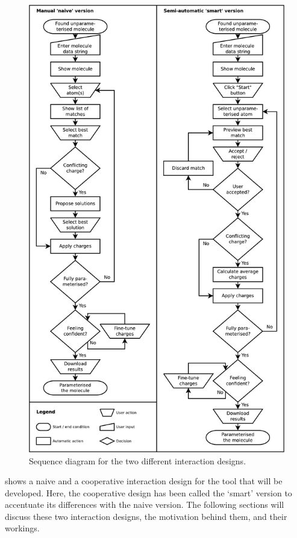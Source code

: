 \begin{figure}[h!]
\begin{center}
\includegraphics[width=.9\textwidth]{img/complete_id.pdf}
\caption{Sequence diagram for the two different interaction designs.}
\vspace{-2cm}
\end{center}
\end{figure}

 shows a naive and a cooperative interaction design for the tool that will be developed. Here, the cooperative design has been called the `smart' version to accentuate its differences with the naive version. The following sections will discuss these two interaction designs, the motivation behind them, and their workings.

